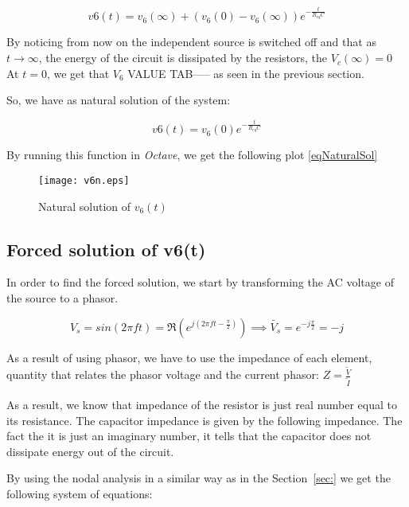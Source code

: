 \begin{equation}
  v6 (t) = v_6(\infty) + (v_6(0) - v_6(\infty)) e^{-\frac{t}{R_{eq}C}}
\end{equation}


By noticing from now on the independent source is switched off and that as $t \rightarrow \infty$, the energy of the circuit is dissipated by the resistors, the $V_c(\infty) = 0$
At $t = 0$, we get that $V_6$ VALUE TAB----- as seen in the previous section.

So, we have as natural solution of the system:

\begin{equation}
  v6 (t) = v_6(0)e^{-\frac{t}{R_{eq}C}}
  \label{eqNaturalSol}
\end{equation}

By running this function in \textit{Octave}, we get the following plot \ref{eqNaturalSol}

\begin{figure}[h] \centering
  \texttt{[image: v6n.eps]}
  \caption{Natural solution of $v_6(t)$ }
  \label{fig:naturalSolution}
\end{figure}


\subsection{Forced solution of v6(t)}

In order to find the forced solution, we start by transforming the AC voltage of the source to a phasor.

\begin{equation}
  V_s = sin(2\pi f t) = \Re (e^{j(2\pi f t - \frac{\pi}{2})}) \implies \tilde{V_s} = e^{-j \frac{\pi}{2}} = -j
\end{equation}

As a result of using phasor, we have to use the impedance of each element, quantity that relates the phasor voltage and the current phasor: $Z = \frac{\tilde{V}}{\tilde{I}} $

As a result, we know that impedance of the resistor is just real number equal to its resistance. The capacitor impedance is given by the following impedance.
The fact the it is just an imaginary number, it tells that the capacitor does not dissipate energy out of the circuit.

By using the nodal analysis in a similar way as in the Section~\ref{sec:} we get the following system of equations:

